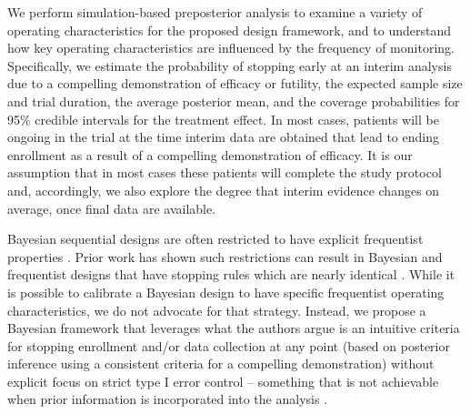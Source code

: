 \documentclass[AMA,STIX1COL,doublespace]{WileyNJD-v2}
\begin{document}
We perform simulation-based preposterior analysis to examine a variety of operating characteristics for the proposed design framework,
and to understand how key operating characteristics are influenced by the frequency of monitoring.
Specifically, we estimate the probability of stopping early at an interim analysis due to a compelling demonstration of efficacy or futility, the expected sample size and trial duration, the average posterior mean, and the coverage probabilities for 95\% credible intervals for the treatment effect. 
In most cases, patients will be ongoing in the trial at the time interim data are obtained that lead to 
ending enrollment as a result of a compelling demonstration of efficacy. 
It is our assumption that in most cases these patients will complete the study protocol and, accordingly, we also explore 
the degree that interim evidence changes on average, once final data are available.	

Bayesian sequential designs are often restricted to have explicit frequentist properties \citep{Ventz2015, Zhu2015}. 
Prior work has shown such restrictions can result in Bayesian and frequentist designs that have stopping rules which are 
nearly identical \citep{Stallard2020, Kopp-Schneider2020, Zhu2019}.
While it is possible to calibrate a Bayesian design to have specific frequentist operating characteristics, we do not advocate
for that strategy.
Instead, we propose a Bayesian framework that leverages what the authors argue is an intuitive criteria for stopping enrollment 
and/or data collection at any point (based on posterior inference using a consistent criteria for a compelling demonstration) without 
explicit focus on strict type I error control -- something that is not achievable when prior information is incorporated into 
the analysis \citep{Psioda2018}.
\end{document}
